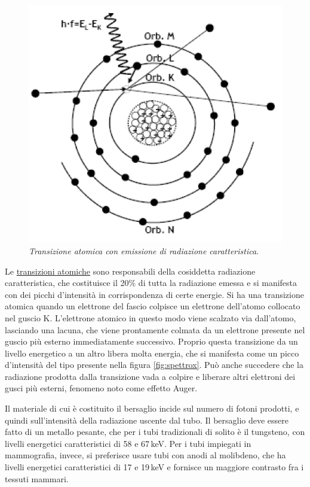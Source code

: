 \documentclass{report}
\newcommand{\figref}[1]{figura \ref{#1}}
\numberwithin{equation}{section}
\numberwithin{figure}{section}
\begin{document}
\begin{figure}[htp]
\centering
\includegraphics[scale=0.6]{immagini/transizione.png}
\caption{\label{fig:transizione} \textit{Transizione atomica con emissione di radiazione caratteristica}.}
\end{figure}

Le \underline{transizioni atomiche} sono responsabili della cosiddetta radiazione caratteristica, che costituisce il 20\% di tutta la radiazione emessa e si manifesta con dei picchi d'intensità in corrispondenza di certe energie. Si ha una transizione atomica quando un elettrone del fascio colpisce un elettrone dell'atomo collocato nel guscio K. L'elettrone atomico in questo modo viene scalzato via dall'atomo, lasciando una lacuna, che viene prontamente colmata da un elettrone presente nel guscio più esterno immediatamente successivo. Proprio questa transizione da un livello energetico a un altro libera molta energia, che si manifesta come un picco d'intensità del tipo presente nella \figref{fig:spettrox}. Può anche succedere che la radiazione prodotta dalla transizione vada a colpire e liberare altri elettroni dei gusci più esterni, fenomeno noto come effetto Auger.

Il materiale di cui è costituito il bersaglio incide sul numero di fotoni prodotti, e quindi sull'intensità della radiazione uscente dal tubo. Il bersaglio deve essere fatto di un metallo pesante, che per i tubi tradizionali di solito è il tungsteno, con livelli energetici caratteristici di 58 e 67\,keV. Per i tubi impiegati in mammografia, invece, si preferisce usare tubi con anodi al molibdeno, che ha livelli energetici caratteristici di 17 e 19\,keV e fornisce un maggiore contrasto fra i tessuti mammari.
\end{document}
